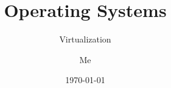 \documentclass[12pt]{beamer}
\title{Operating Systems}
\subtitle{Virtualization}
\author{Me}
\date{\today}
\begin{document}
  \begin{frame}
    \titlepage
  \end{frame}

  
  
  
  
  
  
  

%    
\end{document}
